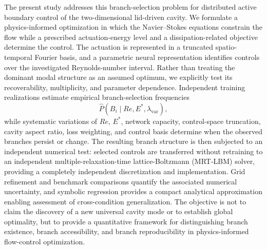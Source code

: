 \documentclass[a4paper,11pt]{article}
\begin{document}
The present study addresses this branch-selection problem for distributed active
boundary control of the two-dimensional lid-driven cavity. We formulate a
physics-informed optimization in which the Navier--Stokes equations constrain
the flow while a prescribed actuation-energy level and a dissipation-related
objective determine the control. The actuation is represented in a truncated
spatio-temporal Fourier basis, and a parametric neural representation identifies
controls over the investigated Reynolds-number interval. Rather than treating the
dominant modal structure as an assumed optimum, we explicitly test its
recoverability, multiplicity, and parameter dependence. Independent training
realizations estimate empirical branch-selection frequencies
\begin{equation}
\widehat P\!\left(B_i\mid Re,E^*,\lambda_{\mathrm{var}}\right),
\label{eq:empirical_freq}
\end{equation}
while systematic variations of \(Re\), \(E^*\), network capacity, control-space
truncation, cavity aspect ratio, loss weighting, and control basis determine when
the observed branches persist or change. The resulting branch structure is then
subjected to an independent numerical test: selected controls are transferred
without retraining to an independent multiple-relaxation-time lattice-Boltzmann
(MRT-LBM) solver, providing a completely independent discretization and
implementation. Grid refinement and benchmark comparisons quantify the associated
numerical uncertainty, and symbolic regression provides a compact analytical
approximation enabling assessment of cross-condition generalization. The objective
is not to claim the discovery of a new universal cavity mode or to establish global
optimality, but to provide a quantitative framework for distinguishing branch
existence, branch accessibility, and branch reproducibility in physics-informed
flow-control optimization.
\end{document}
